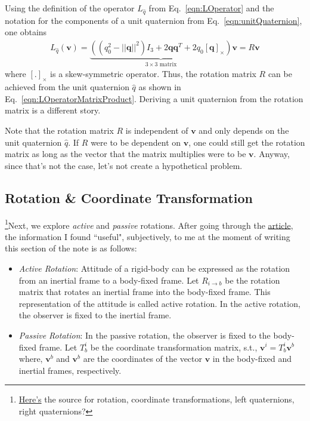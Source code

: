 Using the definition of the operator $L_{\hat q}$ from Eq.~\ref{eqn:LOperator} and the notation for the components of a unit quaternion from Eq.~\ref{eqn:unitQuaternion}, one obtains
\begin{align}
    L_{\hat q}(\boldsymbol{v}) = \underbrace{\left( \left( q_0^2 - ||\boldsymbol{q}||^2 \right) I_3 + 2 \boldsymbol{q} \boldsymbol{q}^T + 2 q_0 [\boldsymbol{q}]_{\times} \right)}_{\text{$3 \times 3$ matrix}} \boldsymbol{v} = R \boldsymbol{v}
    \label{eqn:LOperatorMatrixProduct}
\end{align}
where $[.]_{\times}$ is a skew-symmetric operator. Thus, the rotation matrix $R$ can be achieved from the unit quaternion $\hat q$ as shown in Eq.~\ref{eqn:LOperatorMatrixProduct}. Deriving a unit quaternion from the rotation matrix is a different story.

Note that the rotation matrix $R$ is independent of $\boldsymbol{v}$ and only depends on the unit quaternion $\hat q$. If $R$ were to be dependent on $\boldsymbol{v}$, one could still get the rotation matrix as long as the vector that the matrix multiplies were to be $\boldsymbol{v}$. Anyway, since that's not the case, let's not create a hypothetical problem.

\subsection{Rotation \& Coordinate Transformation}
\hspace{\parindent}\footnote{\href{https://sites.utexas.edu/near/files/2022/07/Rotations.pdf}{Here's} the source for rotation, coordinate transformations, left quaternions, right quaternions?}Next, we explore \textit{active} and \textit{passive} rotations. After going through the \href{https://sites.utexas.edu/near/files/2022/07/Rotations.pdf}{article}, the information I found ``useful", subjectively, to me at the moment of writing this section of the note is as follows:
\begin{itemize}
    \item \textit{Active Rotation}: Attitude of a rigid-body can be expressed as the rotation from an inertial frame to a body-fixed frame. Let $R_{i \rightarrow b}$ be the rotation matrix that rotates an inertial frame into the body-fixed frame. This representation of the attitude is called active rotation. In the active rotation, the observer is fixed to the inertial frame.
    \item \textit{Passive Rotation}: In the passive rotation, the observer is fixed to the body-fixed frame. Let $T_{b}^{i}$ be the coordinate transformation matrix, s.t., $\boldsymbol{v}^i = T_{b}^i \boldsymbol{v}^b$ where, $\boldsymbol{v}^b$ and $\boldsymbol{v}^b$ are the coordinates of the vector $\boldsymbol{v}$ in the body-fixed and inertial frames, respectively.
\end{itemize}

